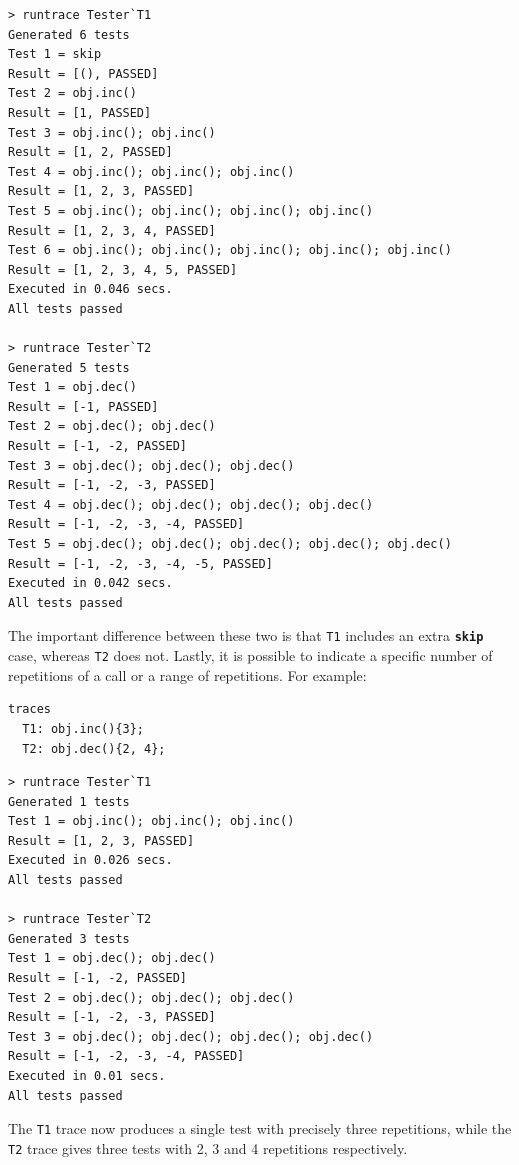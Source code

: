 \documentclass{overturerepchap}
\begin{document}
\lstset{style=tool,language=}
\begin{lstlisting}[escapechar=@]
> runtrace Tester`T1
Generated 6 tests
Test 1 = skip
Result = [(), PASSED]
Test 2 = obj.inc()
Result = [1, PASSED]
Test 3 = obj.inc(); obj.inc()
Result = [1, 2, PASSED]
Test 4 = obj.inc(); obj.inc(); obj.inc()
Result = [1, 2, 3, PASSED]
Test 5 = obj.inc(); obj.inc(); obj.inc(); obj.inc()
Result = [1, 2, 3, 4, PASSED]
Test 6 = obj.inc(); obj.inc(); obj.inc(); obj.inc(); obj.inc()
Result = [1, 2, 3, 4, 5, PASSED]
Executed in 0.046 secs. 
All tests passed

> runtrace Tester`T2
Generated 5 tests
Test 1 = obj.dec()
Result = [-1, PASSED]
Test 2 = obj.dec(); obj.dec()
Result = [-1, -2, PASSED]
Test 3 = obj.dec(); obj.dec(); obj.dec()
Result = [-1, -2, -3, PASSED]
Test 4 = obj.dec(); obj.dec(); obj.dec(); obj.dec()
Result = [-1, -2, -3, -4, PASSED]
Test 5 = obj.dec(); obj.dec(); obj.dec(); obj.dec(); obj.dec()
Result = [-1, -2, -3, -4, -5, PASSED]
Executed in 0.042 secs. 
All tests passed
\end{lstlisting}
\lstset{style=mystyle}
\lstset{language=VDM++}
\normalsize

\noindent The important difference between these two is that \texttt{T1} includes an extra
\texttt{\textbf{skip}} case, whereas \texttt{T2} does not.
Lastly, it is possible to indicate a specific number of repetitions of a call or
a range of repetitions. For example:

\small
\begin{lstlisting}
traces
  T1: obj.inc(){3};
  T2: obj.dec(){2, 4};
\end{lstlisting}

\lstset{style=tool,language=}
\begin{lstlisting}[escapechar=@]
> runtrace Tester`T1
Generated 1 tests
Test 1 = obj.inc(); obj.inc(); obj.inc()
Result = [1, 2, 3, PASSED]
Executed in 0.026 secs. 
All tests passed

> runtrace Tester`T2
Generated 3 tests
Test 1 = obj.dec(); obj.dec()
Result = [-1, -2, PASSED]
Test 2 = obj.dec(); obj.dec(); obj.dec()
Result = [-1, -2, -3, PASSED]
Test 3 = obj.dec(); obj.dec(); obj.dec(); obj.dec()
Result = [-1, -2, -3, -4, PASSED]
Executed in 0.01 secs. 
All tests passed
\end{lstlisting}
\lstset{style=mystyle}
\lstset{language=VDM++}
\normalsize

\noindent The \texttt{T1} trace now produces a single test with precisely three
repetitions, while the \texttt{T2} trace gives three tests with 2, 3 and 4
repetitions respectively.
\end{document}
